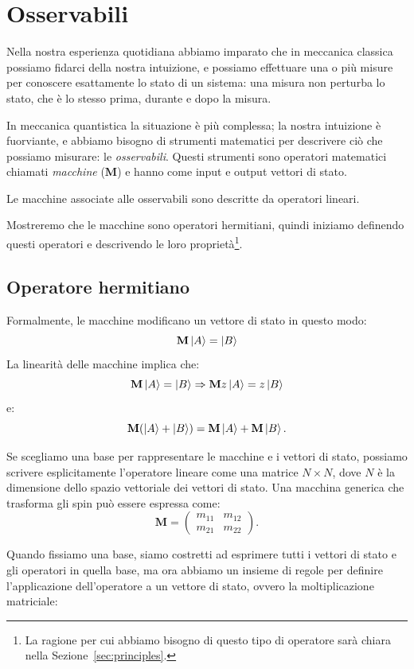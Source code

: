 \section{Osservabili}
Nella nostra esperienza quotidiana abbiamo imparato che in meccanica classica possiamo fidarci della nostra intuizione, e possiamo effettuare una o più misure per conoscere esattamente lo stato di un sistema: una misura non perturba lo stato, che è lo stesso prima, durante e dopo la misura.

In meccanica quantistica la situazione è più complessa; la nostra intuizione è fuorviante, e abbiamo bisogno di strumenti matematici per descrivere ciò che possiamo misurare: le \emph{osservabili}. Questi strumenti sono operatori matematici chiamati \emph{macchine} ($\mathbf{M}$) e hanno come input e output vettori di stato.

\begin{axiom}
	Le macchine associate alle osservabili sono descritte da operatori lineari.
\end{axiom}

Mostreremo che le macchine sono operatori hermitiani, quindi iniziamo definendo questi operatori e descrivendo le loro proprietà\footnote{La ragione per cui abbiamo bisogno di questo tipo di operatore sarà chiara nella Sezione~\ref{sec:principles}.}.

\subsection{Operatore hermitiano}
\noindent Formalmente, le macchine modificano un vettore di stato in questo modo:
\[
\mathbf{M} \Ket{A} = \Ket{B}
\]
La linearità delle macchine implica che:
\[
\mathbf{M} \Ket{A} = \Ket{B} \Rightarrow \mathbf{M} z\Ket{A} = z\Ket{B}
\]
e:
\[
\mathbf{M}(\Ket{A}+\Ket{B}) = \mathbf{M}\Ket{A} + \mathbf{M}\Ket{B}.
\]

Se scegliamo una base per rappresentare le macchine e i vettori di stato, possiamo scrivere esplicitamente l'operatore lineare come una matrice $N\times N$, dove $N$ è la dimensione dello spazio vettoriale dei vettori di stato. Una macchina generica che trasforma gli spin può essere espressa come:
\[
\mathbf{M} = \begin{pmatrix}
	m_{11} &  m_{12}\\
	m_{21} &  m_{22}
\end{pmatrix}.
\]

Quando fissiamo una base, siamo costretti ad esprimere tutti i vettori di stato e gli operatori in quella base, ma ora abbiamo un insieme di regole per definire l'applicazione dell'operatore a un vettore di stato, ovvero la moltiplicazione matriciale:

